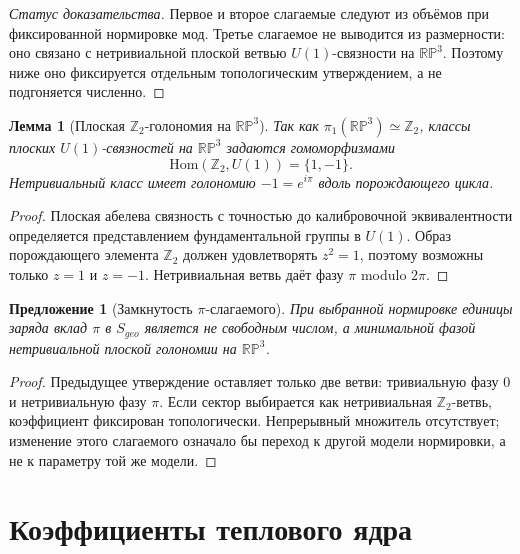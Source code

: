 \documentclass[12pt,a4paper]{report}
\newtheorem{lemma}{Лемма}[chapter]
\newtheorem{proposition}{Предложение}[chapter]
\theoremstyle{remark}
\begin{document}
\begin{proof}[Статус доказательства]
Первое и второе слагаемые следуют из объёмов при фиксированной нормировке мод. Третье слагаемое не выводится из размерности: оно связано с нетривиальной плоской ветвью \(U(1)\)-связности на \(\mathbb{RP}^3\). Поэтому ниже оно фиксируется отдельным топологическим утверждением, а не подгоняется численно.
\end{proof}

\begin{lemma}[Плоская \(\mathbb{Z}_2\)-голономия на \(\mathbb{RP}^3\)]
Так как \(\pi_1(\mathbb{RP}^3)\simeq\mathbb{Z}_2\), классы плоских \(U(1)\)-связностей на \(\mathbb{RP}^3\) задаются гомоморфизмами
\begin{equation}
    \mathrm{Hom}(\mathbb{Z}_2,U(1))=\{1,-1\}.
\end{equation}
Нетривиальный класс имеет голономию \(-1=e^{i\pi}\) вдоль порождающего цикла.
\end{lemma}

\begin{proof}
Плоская абелева связность с точностью до калибровочной эквивалентности определяется представлением фундаментальной группы в \(U(1)\). Образ порождающего элемента \(\mathbb{Z}_2\) должен удовлетворять \(z^2=1\), поэтому возможны только \(z=1\) и \(z=-1\). Нетривиальная ветвь даёт фазу \(\pi\) modulo \(2\pi\).
\end{proof}

\begin{proposition}[Замкнутость \(\pi\)-слагаемого]
При выбранной нормировке единицы заряда вклад \(\pi\) в \(S_{geo}\) является не свободным числом, а минимальной фазой нетривиальной плоской голономии на \(\mathbb{RP}^3\).
\end{proposition}

\begin{proof}
Предыдущее утверждение оставляет только две ветви: тривиальную фазу \(0\) и нетривиальную фазу \(\pi\). Если сектор выбирается как нетривиальная \(\mathbb{Z}_2\)-ветвь, коэффициент фиксирован топологически. Непрерывный множитель отсутствует; изменение этого слагаемого означало бы переход к другой модели нормировки, а не к параметру той же модели.
\end{proof}

\section{Коэффициенты теплового ядра}
\end{document}
